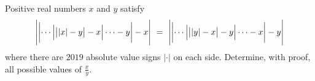 Positive real numbers $x$ and $y$ satisfy$$\Biggl|\biggl|\cdots\Bigl|\bigl||x|-y\bigr|-x\Bigr|\cdots -y\biggr|-x\Biggr|\ =\ \Biggl|\biggl|\cdots\Bigl|\bigl||y|-x\bigr|-y\Bigr|\cdots -x\biggr|-y\Biggr|$$where there are $2019$ absolute value signs $|\cdot|$ on each side. Determine, with proof, all possible values of $\frac{x}{y}$.